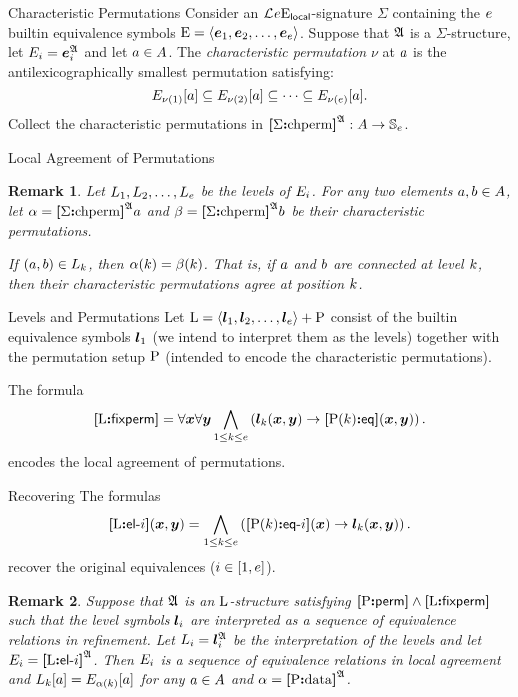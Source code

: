 \documentclass{beamer}
\newtheorem{remark}{Remark}
\begin{document}
\begin{frame}{Characteristic Permutations}
Consider an $\mathcal{L}^{{}}_{{}}{e}\mathrm{E}_{\mathsf{local}}$-signature $\Sigma$ containing
the $e$ builtin equivalence symbols ${\mathrm{E}} = \left\langle \bm{e}_{1},\bm{e}_{2},\dots,\bm{e}_{e} \right\rangle$.
Suppose that $\mathfrak{A}$ is a $\Sigma$-structure, let $E_{i} =
\bm{e}_{i}^{\mathfrak{A}}$ and let $a\in A$.
The \emph{characteristic permutation} $\nu$ at $a$ is the
antilexicographically smallest permutation satisfying:
\[
E_{\nu(1)}[a] \subseteq E_{\nu(2)}[a] \subseteq \dots
\subseteq E_{\nu(e)}[a].
\]
Collect the characteristic permutations in ${\bm{[}\Sigma\mathord{\bm{:}}\mathrm{chperm}\bm{]}}^{\mathfrak{A}} : A \to
\mathbb{S}_{e}$.
\end{frame}

\begin{frame}{Local Agreement of Permutations}
\begin{remark}
Let $L_{1},L_{2},\dots,L_{e}$ be the levels of $E_{i}$.
For any two elements $a,b\in A$, let $\alpha = {\bm{[}\Sigma\mathord{\bm{:}}\mathrm{chperm}\bm{]}}^{\mathfrak{A}}a$
and $\beta = {\bm{[}\Sigma\mathord{\bm{:}}\mathrm{chperm}\bm{]}}^{\mathfrak{A}}b$ be their characteristic permutations.

If $(a,b)\in L_{k}$, then $\alpha(k) = \beta(k)$.
That is, if $a$ and $b$ are connected at level $k$, then their
characteristic permutations agree at position $k$.
\end{remark}
\end{frame}

\begin{frame}{Levels and Permutations}
Let ${\mathrm{L}} = \left\langle \bm{l}_{1},\bm{l}_{2},\dots,\bm{l}_{e} \right\rangle + {\mathrm{P}}$ consist of the builtin
equivalence symbols $\bm{l}_{1}$ (we intend to interpret them as the levels)
together with the permutation setup ${\mathrm{P}}$ (intended to encode the
characteristic permutations).

The formula
\[
  {\bm{[}{\mathrm{L}}\mathord{\bm{:}}\mathsf{fixperm}\bm{]}} = \forall\bm{x} \forall\bm{y} \bigwedge_{1 \leq k \leq e}
  \left(\bm{l}_{k}(\bm{x},\bm{y}) \rightarrow {\bm{[}{\mathrm{P}}(k)\mathord{\bm{:}}\mathsf{eq}\bm{]}}(\bm{x},\bm{y})\right).
\]
encodes the local agreement of permutations.
\end{frame}

\begin{frame}{Recovering}
The formulas
\[
  {\bm{[}{\mathrm{L}}\mathord{\bm{:}}\mathsf{el}{\hbox{-}}i\bm{]}}(\bm{x},\bm{y}) = \bigwedge_{1 \leq k \leq e}
  \left({\bm{[}{\mathrm{P}}(k)\mathord{\bm{:}}\mathsf{eq}{\hbox{-}}i\bm{]}}(\bm{x}) \rightarrow \bm{l}_{k}(\bm{x},\bm{y})\right).
\]
recover the original equivalences ($i\in[1,e]$).
\begin{remark}
Suppose that $\mathfrak{A}$ is an ${\mathrm{L}}$-structure satisfying
${\bm{[}{\mathrm{P}}\mathord{\bm{:}}\mathsf{perm}\bm{]}}\land{\bm{[}{\mathrm{L}}\mathord{\bm{:}}\mathsf{fixperm}\bm{]}}$ such that the level symbols $\bm{l}_{i}$ are
interpreted as a sequence of equivalence relations in refinement.
Let $L_{i} = \bm{l}_{i}^{\mathfrak{A}}$ be the interpretation of the levels and let
$E_{i} = {\bm{[}{\mathrm{L}}\mathord{\bm{:}}\mathsf{el}{\hbox{-}}i\bm{]}}^{\mathfrak{A}}$.
Then $E_{i}$ is a sequence of equivalence relations in local agreement and
$L_{k}[a] = E_{\alpha(k)}[a]$ for any $a\in A$ and $\alpha =
{\bm{[}{\mathrm{P}}\mathord{\bm{:}}\mathrm{data}\bm{]}}^{\mathfrak{A}}$.
\end{remark}
\end{frame}
\end{document}
